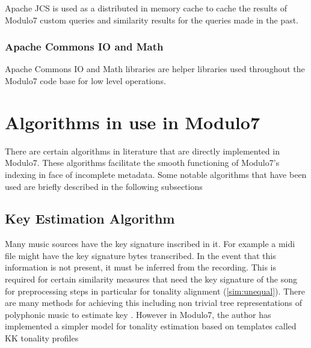 \noindent Apache JCS is used as a distributed in memory cache to cache the results of Modulo7 custom queries and similarity results for the queries made in the past. 

\subsection{Apache Commons IO and Math}

\noindent Apache Commons IO and Math libraries are helper libraries used throughout the Modulo7 code base for low level operations. 

\chapter{Algorithms in use in Modulo7}

\noindent There are certain algorithms in literature that are directly implemented in Modulo7. These algorithms facilitate the smooth functioning of Modulo7's indexing in face of incomplete metadata. Some notable algorithms that have been used are briefly described in the following subsections

\section{Key Estimation Algorithm} \label{kktonality}

\noindent Many music sources have the key signature inscribed in it. For example a midi file might have the key signature bytes transcribed. In the event that this information is not present, it must be inferred from the recording. This is required for certain similarity measures that need the key signature of the song for preprocessing steps  in particular for tonality alignment (\ref{sim:unequal}). There are many methods for achieving this including non trivial tree representations of polyphonic music to estimate key \cite{treemodel}. However in Modulo7, the author has implemented a simpler model for tonality estimation based on templates called KK tonality profiles \cite{kkTonalityKeyFinding} \\

